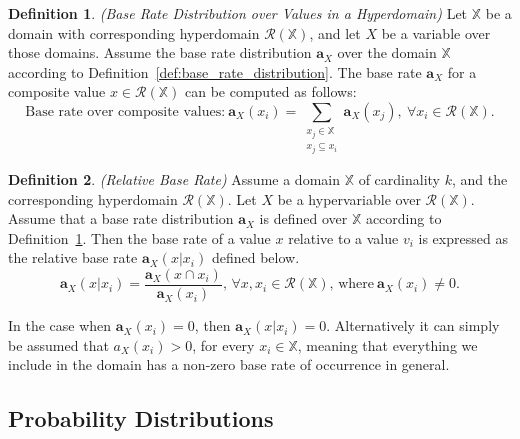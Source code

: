 \documentclass[a4paper,12pt]{article}
\theoremstyle{definition}
\newtheorem{definition}{Definition}[section]
\numberwithin{equation}{section}
\begin{document}
\begin{definition}\label{def:base_rate_distribution_over_values_in_a_hyperdomain}
	\emph{(Base Rate Distribution over Values in a Hyperdomain)} Let $\mathbb{X}$ be a domain with corresponding hyperdomain $\mathcal{R}(\mathbb{X})$, and let $X$ be a variable over those domains. Assume the base rate distribution $\mathbf{a}_X$ over the domain $\mathbb{X}$ according to Definition~\ref{def:base_rate_distribution}. The base rate $\mathbf{a}_X$ for a composite value $x \in \mathcal{R}(\mathbb{X})$ can be computed as follows:
	\begin{equation}
		\text{Base rate over composite values:}\ \mathbf{a}_X(x_i) = \sum_{\substack{x_j \in \mathbb{X} \\ x_j \subseteq x_i}} \mathbf{a}_X(x_j),\ \forall x_i \in \mathcal{R}(\mathbb{X})\text{.}
	\end{equation}
\end{definition}

\begin{definition}
	\emph{(Relative Base Rate)} Assume a domain $\mathbb{X}$ of cardinality $k$, and the corresponding hyperdomain $\mathcal{R}(\mathbb{X})$. Let $X$ be a hypervariable over $\mathcal{R}(\mathbb{X})$. Assume that a base rate distribution $\mathbf{a}_X$ is defined over $\mathbb{X}$ according to Definition~\ref{def:base_rate_distribution_over_values_in_a_hyperdomain}. Then the base rate of a value $x$ relative to a value $v_i$ is expressed as the relative base rate $\mathbf{a}_X(x|x_i)$ defined below.
	\begin{equation}
		\mathbf{a}_X(x|x_i) = \dfrac{\mathbf{a}_X(x \cap x_i)}{\mathbf{a}_X(x_i)}\text{, } \forall x, x_i \in \mathcal{R}(\mathbb{X}) \text{, where}\ \mathbf{a}_X(x_i) \neq 0\text{.}
	\end{equation}
	
	In the case when $\mathbf{a}_X(x_i) = 0$, then $\mathbf{a}_X(x|x_i) = 0$. Alternatively it can simply be assumed that $a_X(x_i) > 0$, for every $x_i \in \mathbb{X}$, meaning that everything we include in the domain has a non-zero base rate of occurrence in general.
\end{definition}

\subsection{Probability Distributions}
\end{document}
